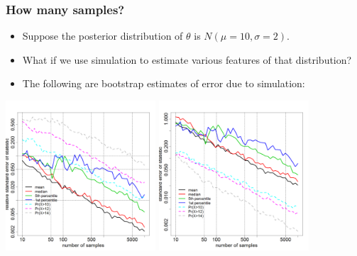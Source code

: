 \documentclass[handout]{beamer}
\begin{document}
\begin{frame}
  \frametitle{How many samples?}

\vspace{-0.1in}
\begin{footnotesize}
\begin{itemize}
\item Suppose the posterior distribution of $\theta$ is $N\left(\mu = 10, \sigma = 2\right)$.
\item What if we use simulation to estimate various features of that distribution?
\item The following are bootstrap estimates of error due to simulation:
\end{itemize}
\end{footnotesize}
\includegraphics[width=2.2in]{graphics/simPrecision001.png}
\includegraphics[width=2.2in]{graphics/simPrecision002.png}

\end{frame}
\end{document}
